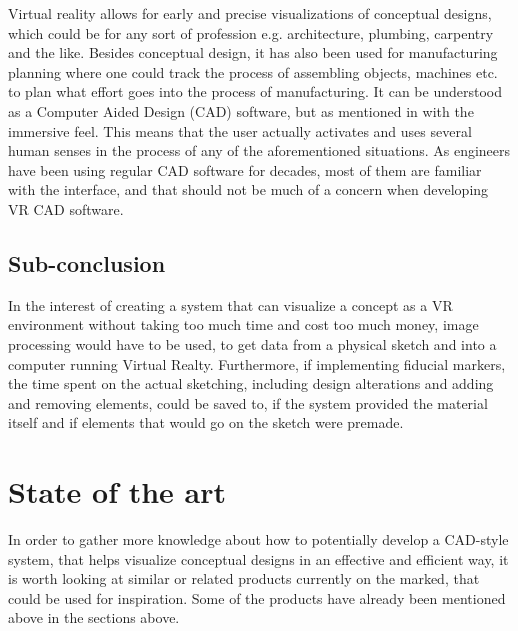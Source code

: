 	Virtual reality allows for early and precise visualizations of conceptual designs, which could be for any sort of profession e.g. architecture, plumbing, carpentry and the like. Besides conceptual design, it has also been used for manufacturing planning where one could track the process of assembling objects, machines etc. to plan what effort goes into the process of manufacturing. It can be understood as a Computer Aided Design (CAD) software, but as mentioned in \cite{engineeringVR} with the immersive feel. This means that the user actually activates and uses several human senses in the process of any of the aforementioned situations. As engineers have been using regular CAD software for decades, most of them are familiar with the interface, and that should not be much of a concern when developing VR CAD software.

	\subsection{Sub-conclusion}
	In the interest of creating a system that can visualize a concept as a VR environment without taking too much time and cost too much money, image processing would have to be used, to get data from a physical sketch and into a computer running Virtual Realty. Furthermore, if implementing fiducial markers, the time spent on the actual sketching, including design alterations and adding and removing elements, could be saved to, if the system provided the material itself and if elements that would go on the sketch were premade.

    \section{State of the art}\label{sec:SOTA}
    In order to gather more knowledge about how to potentially develop a CAD-style system, that helps visualize conceptual designs in an effective and efficient way, it is worth looking at similar or related products currently on the marked, that could be used for inspiration. Some of the products have already been mentioned above in the sections above.
	  

